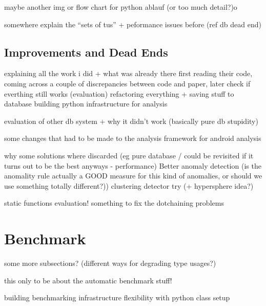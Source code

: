 maybe another img or flow chart for python ablauf (or too much detail?)o

somewhere explain the ``sets of tus'' + peformance issues before (ref db dead end)


\subsection{Improvements and Dead Ends}

explaining all the work i did + what was already there
    first reading their code, coming across a couple of discrepancies between code and paper, later check if everthing still works (evaluation)
    refactoring everything + saving stuff to database
    building python infrastructure for analysis

evaluation of other db system + why it didn't work (basically pure db stupidity)

some changes that had to be made to the analysis framework for android analysis

why some solutions where discarded (eg pure database / could be revisited if it turns out to be the best anyways - performance)
Better anomaly detection (is the anomality rule actually a GOOD measure for this kind of anomalies, or should we use something totally different?))
    clustering detector try (+ hypersphere idea?)

static functions evaluation!
something to fix the dotchaining problems

\section{Benchmark}
some more subsections? (different ways for degrading type usages?)

this only to be about the automatic benchmark stuff!

building benchmarking infrastructure
flexibility with python class setup
